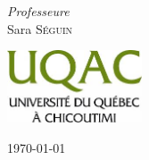 \documentclass[french,12pt]{article} %
\begin{document}
\begin{titlepage}
	
	{\large\textit{Professeure}}\\
	Sara \textsc{Séguin} %
	
	
	\vfill\vfill
	\includegraphics[width=0.3\textwidth]{logo.jpg}\\[1cm] %

	
	\vfill\vfill\vfill %
	
	{\large\today} %
	
	\vfill %

	
\end{titlepage}	

\newpage %
\nocite{AnaBusic2013cours}
\nocite{Halioui2004web}
\nocite{Grandcolas2006web}
\nocite{Moore2016wiki}
\nocite{Olckers2019web}
\nocite{Kumar2019web}
\nocite{Bejian2003web}
\nocite{Edmonds1971article}
\nocite{Glouton2015wiki}
\nocite{NFP1362018cours}
\nocite{Norbert2014book}
\nocite{nguyen2018greedy}
\nocite{Hamel2016cours}
\nocite{Olckers2019web}
\nocite{Freak2018top}
\nocite{tuto2014sdz}



\end{document}
